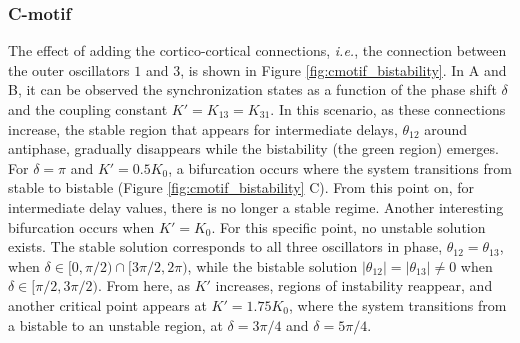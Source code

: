 \documentclass[../main.tex]{subfiles}
\begin{document}
\subsubsection{C-motif}
The effect of adding the cortico-cortical connections, \textit{i.e.}, the connection between the outer oscillators $1$ and $3$, is shown in Figure \ref{fig:cmotif_bistability}.
In A and B, it can be observed the synchronization states as a function of the phase shift $\delta$ and the coupling constant $K' = K_{13} = K_{31}$.
In this scenario, as these connections increase, the stable region that appears for intermediate delays, $\theta_{12}$ around antiphase, gradually disappears while the bistability (the green region) emerges.
For $\delta=\pi$ and $K'= 0.5K_0$, a bifurcation occurs where the system transitions from stable to bistable (Figure \ref{fig:cmotif_bistability} C).
From this point on, for intermediate delay values, there is no longer a stable regime.
Another interesting bifurcation occurs when $K'=K_0$. 
For this specific point, no unstable solution exists. The stable solution corresponds to all three oscillators in phase, $\theta_{12}=\theta_{13}$, when $\delta \in [0,\pi/2) \cap [3\pi/2,2\pi)$, while the bistable solution $|\theta_{12}| = |\theta_{13}| \neq 0$ when $\delta \in [\pi/2, 3\pi/2)$.
From here, as $K'$ increases, regions of instability reappear, and another critical point appears at $K'=1.75K_0$, where the system transitions from a bistable to an unstable region, at $\delta = 3\pi/4$ and $\delta = 5\pi/4$.
\end{document}
